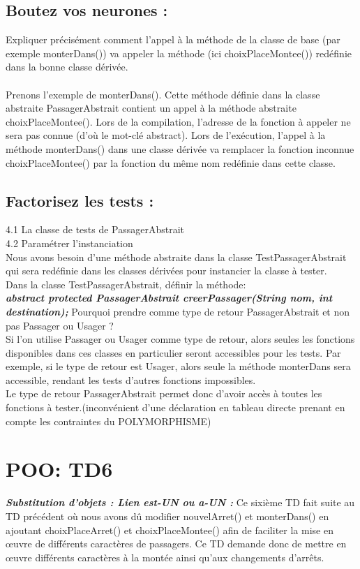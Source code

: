 \documentclass{article}
\begin{document}
\subsection{Boutez vos neurones :}
Expliquer précisément comment l’appel à la méthode de la classe de base (par exemple
monterDans()) va appeler la méthode (ici choixPlaceMontee()) redéfinie dans la bonne
classe dérivée.\\
\\
Prenons l’exemple de monterDans(). Cette méthode définie dans la classe abstraite
PassagerAbstrait contient un appel à la méthode abstraite choixPlaceMontee().
Lors de la compilation, l’adresse de la fonction à appeler ne sera pas connue (d’où le
mot-clé abstract).
Lors de l'exécution, l’appel à la méthode monterDans() dans une classe dérivée va
remplacer la fonction inconnue choixPlaceMontee() par la fonction du même nom redéfinie
dans cette classe.\\
\subsection{Factorisez les tests : }
4.1 La classe de tests de PassagerAbstrait\\
4.2 Paramétrer l’instanciation\\
Nous avons besoin d’une méthode abstraite dans la classe TestPassagerAbstrait qui sera
redéfinie dans les classes dérivées pour instancier la classe à tester.\\
Dans la classe TestPassagerAbstrait, définir la méthode:\\
\textbf{\textit{abstract protected PassagerAbstrait creerPassager(String nom, int
destination);}}
Pourquoi prendre comme type de retour PassagerAbstrait et non pas Passager ou Usager ?\\
Si l’on utilise Passager ou Usager comme type de retour, alors seules les fonctions
disponibles dans ces classes en particulier seront accessibles pour les tests. Par exemple, si le type de retour est Usager, alors seule la méthode monterDans sera accessible, rendant les tests d’autres fonctions impossibles. \\
Le type de retour PassagerAbstrait permet donc d’avoir accès à toutes les fonctions à
tester.(inconvénient d'une déclaration en tableau directe prenant en compte les contraintes du POLYMORPHISME)
\newline
\section{POO: TD6}
\textit{\textbf{Substitution d'objets : Lien est-UN ou a-UN : }}
Ce sixième TD fait suite au TD précédent où nous avons dû modifier nouvelArret() et monterDans() en ajoutant choixPlaceArret() et choixPlaceMontee() afin de faciliter la mise en œuvre de différents caractères de passagers. Ce TD demande donc de mettre en œuvre différents caractères à la montée ainsi qu’aux changements d’arrêts.
\end{document}

